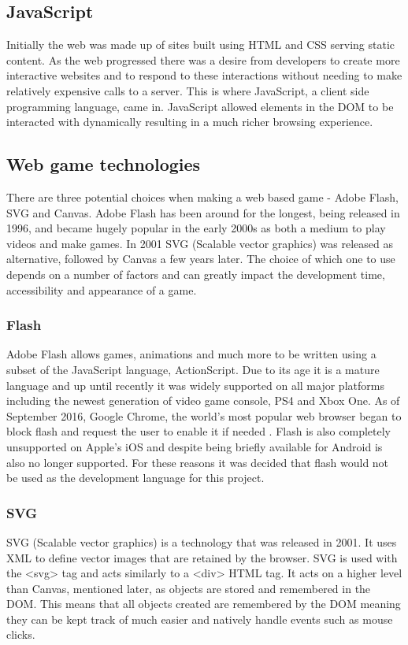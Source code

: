 \documentclass[12pt,a4paper]{report}
\begin{document}
\subsection{JavaScript}
Initially the web was made up of sites built using HTML and CSS serving static content. As the web progressed there was a desire from developers to create more interactive websites and to respond to these interactions without needing to make relatively expensive calls to a server. This is where JavaScript, a client side programming language, came in. JavaScript allowed elements in the DOM to be interacted with dynamically resulting in a much richer browsing experience.

\subsection{Web game technologies}
There are three potential choices when making a web based game - Adobe Flash, SVG and Canvas. Adobe Flash has been around for the longest, being released in 1996, and became hugely popular in the early 2000s as both a medium to play videos and make games. In 2001 SVG (Scalable vector graphics) was released as alternative, followed by Canvas a few years later. The choice of which one to use depends on a number of factors and can greatly impact the development time, accessibility and appearance of a game. 

\subsubsection{Flash}
Adobe Flash allows games, animations and much more to be written using a subset of the JavaScript language, ActionScript. Due to its age it is a mature language and up until recently it was widely supported on all major platforms including the newest generation of video game console, PS4 and Xbox One. As of September 2016, Google Chrome, the world's most popular web browser began to block flash and request the user to enable it if needed \citep{FlashInChrome}. Flash is also completely unsupported on Apple's iOS and despite being briefly available for Android is also no longer supported. For these reasons it was decided that flash would not be used as the development language for this project.


\subsubsection{SVG}
SVG (Scalable vector graphics) is a technology that was released in 2001. 
It uses XML to define vector images that are retained by the browser. SVG is used with the <svg> tag and acts similarly to a <div> HTML tag. It acts on a higher level than Canvas, mentioned later, as objects are stored and remembered in the DOM. This means that all objects created are remembered by the DOM meaning they can be kept track of much easier and natively handle events such as mouse clicks.
\end{document}
